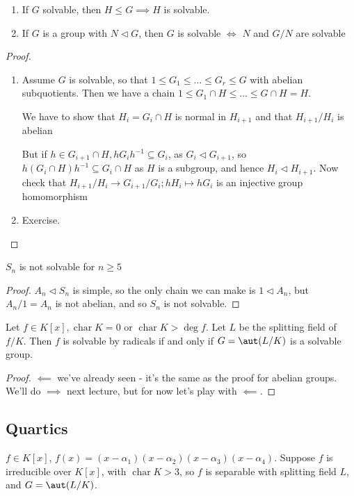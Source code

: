 \documentclass[a4paper, 10pt, twocolumn]{amsart}
\renewcommand{\charr}{\operatorname{char}}
\begin{document}
\begin{proposition}
\item
\begin{enumerate}
\item If $G$ solvable, then $H \leq G \implies H$ is solvable.
\item If $G$ is a group with $N \triangleleft G$, then $G$ is solvable $\iff$ $N$ and $G/N$ are solvable
\end{enumerate}
\end{proposition}
\begin{proof}
\item
\begin{enumerate}
\item Assume $G$ is solvable, so that $1 \leq G_1 \leq \ldots \leq G_r \leq G$ with abelian subquotients. Then we have a chain $1 \leq G_1 \cap H \leq \ldots \leq G \cap H = H$.

We have to show that $H_i = G_i \cap H$ is normal in $H_{i+1}$ and that $H_{i+1}/H_{i}$ is abelian

But if $h \in G_{i+1} \cap H, h G_i h^{-1} \subseteq G_{i}$, as $G_i \triangleleft G_{i+1}$, so $h(G_i \cap H)h^{-1} \subseteq G_i \cap H$ as $H$ is a subgroup, and hence $H_i \triangleleft H_{i+1}$. Now check that $H_{i+1}/H_{i} \to G_{i+1}/G_i; hH_i \mapsto hG_i$ is an injective group homomorphism

\item Exercise.
\end{enumerate}
\end{proof}
\begin{corollary}
$S_n$ is not solvable for $n \geq 5$
\end{corollary}
\begin{proof}
$A_n \triangleleft S_n$ is simple, so the only chain we can make is $1 \triangleleft A_n$, but $A_n/1 = A_n$ is not abelian, and so $S_n$ is not solvable.
\end{proof}
\begin{theorem}[Galois]
Let $f \in K[x], \charr K = 0$ or $\charr K > \deg f$. Let $L$ be the splitting field of $f/K$. Then $f$ is solvable by radicals if and only if $G = \aut(L/K)$ is a solvable group.
\end{theorem}
\begin{proof}
$\impliedby$ we've already seen - it's the same as the proof for abelian groups. We'll do $\implies$ next lecture, but for now let's play with $\impliedby$.
\end{proof}
\subsection*{Quartics}
$f \in K[x]$, $f(x) = (x-\alpha_1)(x-\alpha_2)(x-\alpha_3)(x-\alpha_4)$. Suppose $f$ is irreducible over $K[x]$, with $\charr K > 3$, so $f$ is separable with splitting field $L$, and $G = \aut(L/K)$.
\end{document}
